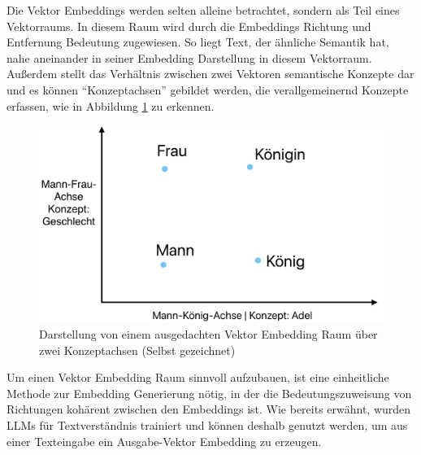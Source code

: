 \documentclass[../main.tex]{subfiles}
\begin{document}
Die Vektor Embeddings werden selten alleine betrachtet, sondern als Teil eines Vektorraums.
In diesem Raum wird durch die Embeddings Richtung und Entfernung Bedeutung zugewiesen.
So liegt Text, der ähnliche Semantik hat, nahe aneinander in seiner Embedding Darstellung in diesem Vektorraum.
Außerdem stellt das Verhältnis zwischen zwei Vektoren semantische Konzepte dar und es können \enquote{Konzeptachsen} gebildet werden, die verallgemeinernd Konzepte erfassen, wie in Abbildung \ref{fig:embeddingspace} zu erkennen.
\cite{heimerl2018interactive,mikolov2013efficient}

\begin{figure}[ht]
    \centering
    \includegraphics[scale=.23]{"bilder/embeddingspace.png"}
    \caption{Darstellung von einem ausgedachten Vektor Embedding Raum über zwei Konzeptachsen (Selbst gezeichnet)}
    \label{fig:embeddingspace}
\end{figure}

Um einen Vektor Embedding Raum sinnvoll aufzubauen, ist eine einheitliche Methode zur Embedding Generierung nötig, in der die Bedeutungszuweisung von Richtungen kohärent zwischen den Embeddings ist.
Wie bereits erwähnt, wurden \glspl{LLM} für Textverständnis trainiert und können deshalb genutzt werden, um aus einer Texteingabe ein Ausgabe-Vektor Embedding zu erzeugen.
\cite{zhang2023language}
\end{document}
